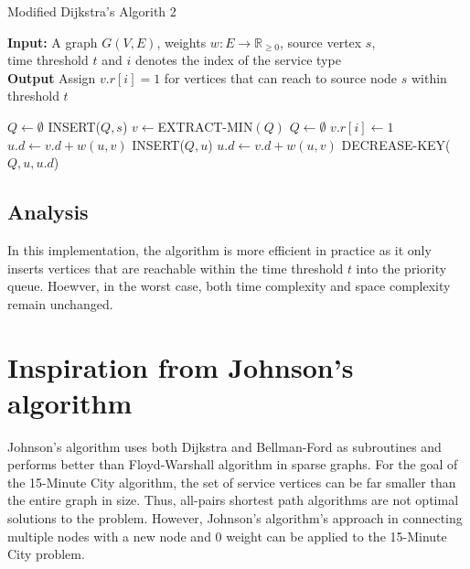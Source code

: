 \begin{algorithm}[H]
    \caption{Modified Dijkstra's Algorith 2} \label{alg:modified_dijsktra2}
    \textbf{Input:} A graph $G(V,E)$, weights $w:E\rightarrow\mathbb{R}_{\geq 0}$, source vertex $s$, \\  time threshold $t$ and $i$ denotes the index of the service type\\
    \textbf{Output} Assign $v.r[i]=1$ for vertices that can reach to source node $s$ within threshold $t$ %
    \begin{algorithmic}
        \State $Q\gets\emptyset$ 
        \State INSERT($Q,s$)
            \State $v\gets$EXTRACT-MIN$(Q)$
                \State $Q\gets\emptyset$ 
            \Else
                \State $v.r[i] \gets 1$
                        \State $u.d\gets v.d+w(u,v)$ %
                        \State INSERT($Q,u$)
                        \State $u.d\gets v.d+w(u,v)$
                        \State DECREASE-KEY($Q,u,u.d$)
                    \EndIf
                \EndFor
            \EndIf
        \EndWhile
    \end{algorithmic}
\end{algorithm}

\subsection{Analysis}

In this implementation, the algorithm is more efficient in practice as it only inserts vertices that are reachable within the time threshold $t$ into the priority queue. Hoewver, in the worst case, both time complexity and space complexity remain unchanged.

\section{Inspiration from Johnson's algorithm}

Johnson's algorithm uses both Dijkstra and Bellman-Ford as subroutines and performs better than Floyd-Warshall algorithm in sparse graphs. For the goal of the 15-Minute City algorithm, the set of service vertices can be far smaller than the entire graph in size. Thus, all-pairs shortest path algorithms are not optimal solutions to the problem. However, Johnson's algorithm's approach in connecting multiple nodes with a new node and $0$ weight can be applied to the 15-Minute City problem.

